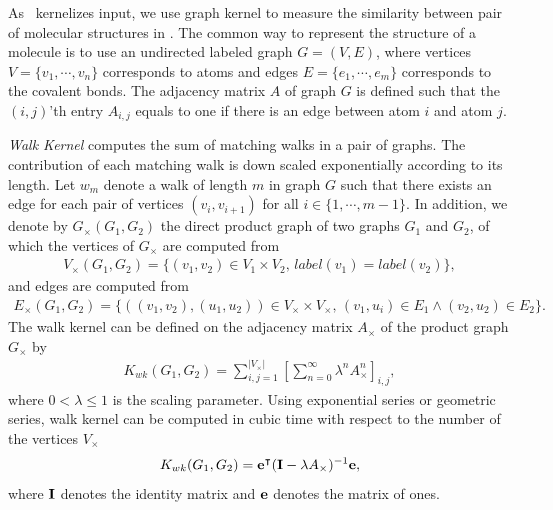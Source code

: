 {

As \mmcrf\ kernelizes input, we use graph kernel to measure the similarity between pair of molecular structures in  .
The common way to represent the structure of a molecule is to use an undirected labeled graph $G=(V,E)$, where vertices $V=\{v_1,\cdots,v_n\}$ corresponds to atoms and edges $E=\{e_1,\cdots,e_m\}$ corresponds to the covalent bonds.
The adjacency matrix $A$ of graph $G$ is defined such that the $(i,j)$'th entry $A_{i,j}$ equals to one if there is an edge between atom $i$ and atom $j$.

\textit{Walk Kernel} \citep{Kashima03marginalized,Gartner03a} computes the sum of matching walks in a pair of graphs. 
The contribution of each matching walk is down scaled exponentially according to its length.  
Let $w_m$ denote a walk of length $m$ in graph $G$ such that there exists an edge for each pair of vertices $(v_i,v_{i+1})$ for all $i\in\{1,\cdots,m-1\}$.
In addition, we denote by $G_{\times}(G_1,G_2)$ the direct product graph of two graphs $G_1$ and $G_2$, of which the vertices of $G_{\times}$ are computed from 
\begin{align*}
	V_{\times}(G_1,G_2) = \{(v_1,v_2)\in V_1\times V_2,\, label(v_1)=label(v_2)\},
\end{align*}
and edges are computed from
\begin{align*}
	E_{\times}(G_1,G_2) = \{((v_1,v_2),(u_1,u_2))\in V_{\times}\times V_{\times},\, (v_1,u_i)\in E_1\wedge (v_2,u_2)\in E_2\}.
\end{align*}
The walk kernel can be defined on the adjacency matrix $A_{\times}$ of the product graph $G_{\times}$ by
\begin{align*}
	K_{wk}(G_1,G_2) = \sum_{i,j=1}^{|V_{\times}|}\left[\sum_{n=0}^{\infty}\lambda^{n}A_{\times}^n\right]_{i,j},
\end{align*}
where $0<\lambda\le1$ is the scaling parameter.
Using exponential series or geometric series, walk kernel can be computed in cubic time \citep{Gartner03a} with respect to the number of the vertices $V_{\times}$
\begin{align*}
	K_{wk}(G_1,G_2) = \mathbf {e}^{\intercal}(\mathbf{I}-\lambda A_{\times})^{-1}\mathbf {e},
\end{align*}
where $\mathbf{I}$ denotes the identity matrix and $\mathbf {e}$ denotes the matrix of ones.

}
